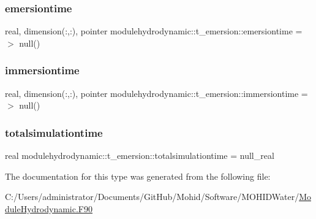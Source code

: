 \subsubsection{\texorpdfstring{emersiontime}{emersiontime}}
{\footnotesize\ttfamily real, dimension(\+:,\+:), pointer modulehydrodynamic\+::t\+\_\+emersion\+::emersiontime =$>$ null()\hspace{0.3cm}{\ttfamily [private]}}

\mbox{\label{structmodulehydrodynamic_1_1t__emersion_a695e419a1885a923d4ea62f548bab7c0}} 
\subsubsection{\texorpdfstring{immersiontime}{immersiontime}}
{\footnotesize\ttfamily real, dimension(\+:,\+:), pointer modulehydrodynamic\+::t\+\_\+emersion\+::immersiontime =$>$ null()\hspace{0.3cm}{\ttfamily [private]}}

\mbox{\label{structmodulehydrodynamic_1_1t__emersion_a821be53fb5eb77387595184fe250eaed}} 
\subsubsection{\texorpdfstring{totalsimulationtime}{totalsimulationtime}}
{\footnotesize\ttfamily real modulehydrodynamic\+::t\+\_\+emersion\+::totalsimulationtime = null\+\_\+real\hspace{0.3cm}{\ttfamily [private]}}



The documentation for this type was generated from the following file\+:\begin{DoxyCompactItemize}
\item 
C\+:/\+Users/administrator/\+Documents/\+Git\+Hub/\+Mohid/\+Software/\+M\+O\+H\+I\+D\+Water/\mbox{\hyperlink{_module_hydrodynamic_8_f90}{Module\+Hydrodynamic.\+F90}}\end{DoxyCompactItemize}
